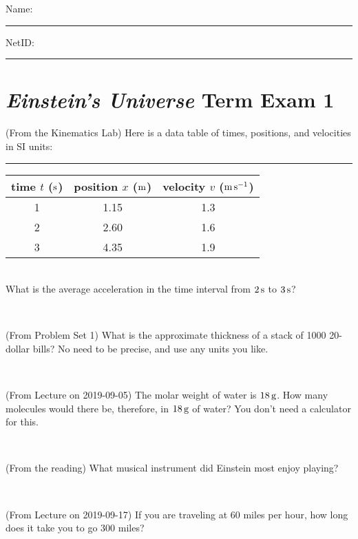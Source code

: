 \documentclass[12pt, letterpaper]{article}
\begin{document}
\noindent
Name: \rule[-1ex]{0.60\textwidth}{0.1pt}
NetID: \rule[-1ex]{0.20\textwidth}{0.1pt}

\section*{\textsl{Einstein's Universe} Term Exam 1}
\setcounter{problem}{1}


\begin{problem} (From the Kinematics Lab)
Here is a data table of times, positions, and velocities in SI units:\\
\rule{1.0in}{0pt}\begin{tabular}{c|c|c}
time $t$ ($\mathrm{s}$) & position $x$ ($\mathrm{m}$) & velocity $v$ ($\mathrm{m}\,\mathrm{s}^{-1}$) \\
\hline
1 & 1.15 & 1.3 \\
2 & 2.60 & 1.6 \\
3 & 4.35 & 1.9 \\
\hline
\end{tabular}\\
What is the average acceleration in the time interval from $2\,\mathrm{s}$ to $3\,\mathrm{s}$?
\end{problem}


\vfill ~

\begin{problem} (From Problem Set 1)
What is the approximate thickness of a stack of 1000 20-dollar bills?
No need to be precise, and use any units you like.
\end{problem}


\vfill ~

\begin{problem} (From Lecture on 2019-09-05)
The molar weight of water is $18\,\mathrm{g}$. How many molecules would there
be, therefore, in $18\,\mathrm{g}$ of water? You don't need a calculator for
this.
\end{problem}


\vfill ~

\begin{problem} (From the reading)
What musical instrument did Einstein most enjoy playing?
\end{problem}


\vfill ~


\clearpage


\begin{problem} (From Lecture on 2019-09-17)
If you are traveling at 60 miles per hour, how long does
it take you to go 300 miles?
\end{problem}
\end{document}
